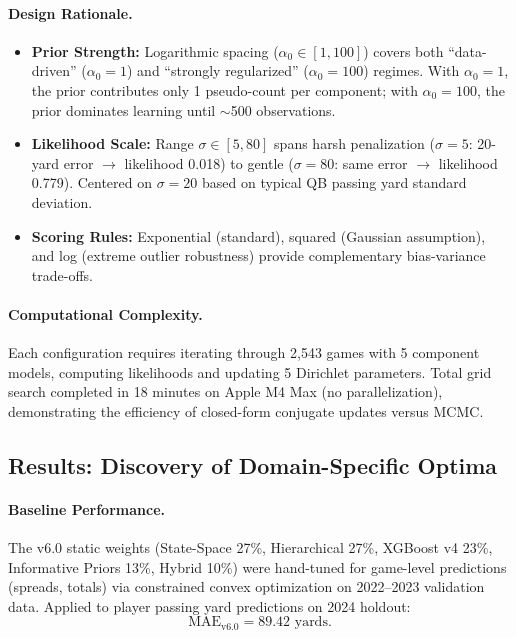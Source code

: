 \paragraph{Design Rationale.}
\begin{itemize}
\item \textbf{Prior Strength:} Logarithmic spacing ($\alpha_0 \in [1, 100]$) covers both ``data-driven'' ($\alpha_0 = 1$) and ``strongly regularized'' ($\alpha_0 = 100$) regimes. With $\alpha_0 = 1$, the prior contributes only 1 pseudo-count per component; with $\alpha_0 = 100$, the prior dominates learning until $\sim$500 observations.

\item \textbf{Likelihood Scale:} Range $\sigma \in [5, 80]$ spans harsh penalization ($\sigma=5$: 20-yard error $\to$ likelihood 0.018) to gentle ($\sigma=80$: same error $\to$ likelihood 0.779). Centered on $\sigma=20$ based on typical QB passing yard standard deviation.

\item \textbf{Scoring Rules:} Exponential (standard), squared (Gaussian assumption), and log (extreme outlier robustness) provide complementary bias-variance trade-offs.
\end{itemize}

\paragraph{Computational Complexity.}
Each configuration requires iterating through 2,543 games with 5 component models, computing likelihoods and updating 5 Dirichlet parameters. Total grid search completed in 18 minutes on Apple M4 Max (no parallelization), demonstrating the efficiency of closed-form conjugate updates versus MCMC.

\subsection{Results: Discovery of Domain-Specific Optima}
\label{subsec:dirichlet-results}

\paragraph{Baseline Performance.}
The v6.0 static weights (State-Space 27\%, Hierarchical 27\%, XGBoost v4 23\%, Informative Priors 13\%, Hybrid 10\%) were hand-tuned for game-level predictions (spreads, totals) via constrained convex optimization on 2022--2023 validation data. Applied to player passing yard predictions on 2024 holdout:
\begin{equation}
\text{MAE}_{\text{v6.0}} = 89.42 \text{ yards}.
\end{equation}

